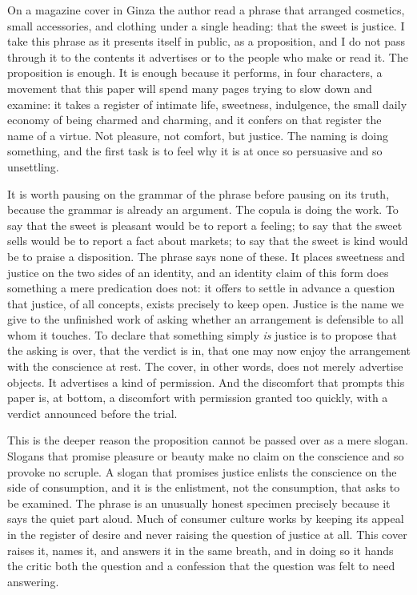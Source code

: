 On a magazine cover in Ginza the author read a phrase that arranged cosmetics, small accessories, and clothing under a single heading: that the sweet is justice.  I take this phrase as it presents itself in public, as a proposition, and I do not pass through it to the contents it advertises or to the people who make or read it. The proposition is enough. It is enough because it performs, in four characters, a movement that this paper will spend many pages trying to slow down and examine: it takes a register of intimate life, sweetness, indulgence, the small daily economy of being charmed and charming, and it confers on that register the name of a virtue. Not pleasure, not comfort, but justice. The naming is doing something, and the first task is to feel why it is at once so persuasive and so unsettling.

It is worth pausing on the grammar of the phrase before pausing on its truth, because the grammar is already an argument. The copula is doing the work. To say that the sweet is pleasant would be to report a feeling; to say that the sweet sells would be to report a fact about markets; to say that the sweet is kind would be to praise a disposition. The phrase says none of these. It places sweetness and justice on the two sides of an identity, and an identity claim of this form does something a mere predication does not: it offers to settle in advance a question that justice, of all concepts, exists precisely to keep open. Justice is the name we give to the unfinished work of asking whether an arrangement is defensible to all whom it touches. To declare that something simply \textit{is} justice is to propose that the asking is over, that the verdict is in, that one may now enjoy the arrangement with the conscience at rest. The cover, in other words, does not merely advertise objects. It advertises a kind of permission. And the discomfort that prompts this paper is, at bottom, a discomfort with permission granted too quickly, with a verdict announced before the trial.

This is the deeper reason the proposition cannot be passed over as a mere slogan. Slogans that promise pleasure or beauty make no claim on the conscience and so provoke no scruple. A slogan that promises justice enlists the conscience on the side of consumption, and it is the enlistment, not the consumption, that asks to be examined. The phrase is an unusually honest specimen precisely because it says the quiet part aloud. Much of consumer culture works by keeping its appeal in the register of desire and never raising the question of justice at all. This cover raises it, names it, and answers it in the same breath, and in doing so it hands the critic both the question and a confession that the question was felt to need answering.

